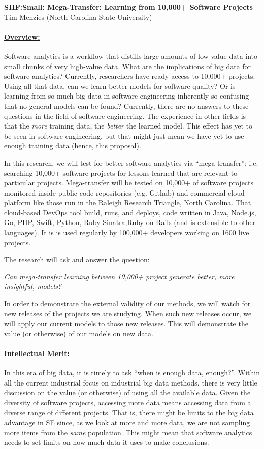 \documentclass[11pt,letterpaper]{article}
\newcommand\myTitle{\newpage
\begin{center}
{\bf SHF:Small: Mega-Transfer: Learning from 10,000+ Software Projects}\\
Tim Menzies (North Carolina State University)
\end{center}}
\newcommand\head[1]{\paragraph{\underline{#1}}}
\begin{document}
\pagestyle{plain}
\myTitle
\pagestyle{empty}

\head{Overview:}
Software analytics is a workflow that distills large amounts of low-value data into small chunks of very high-value data. 
What are the implications of big data for software analytics? Currently, researchers have ready access to 10,000+ projects. 
Using all that data, can we learn better models for software quality?  Or is learning from so much big data in software engineering inherently so confusing that no general models can be found?
Currently, there are no answers to these questions in the field of software engineering.  The experience in other fields is that the
{\em more} training data,  the {\em better} the learned model. This effect has yet to be seen in software engineering,
but that might just mean we have yet to use enough training data (hence, this proposal).

In this research, we will test for   better software analytics
via ``mega-transfer''; i.e. searching  10,000+ software projects for lessons learned that are relevant to particular projects.
Mega-transfer will  be tested on 10,000+  of software projects monitored inside public code repositories (e.g. Github) and commercial cloud platform 
like those run in  the Raleigh Research Triangle,  North Carolina.  
That cloud-based DevOps tool build, runs, and deploys, code written in Java, Node.js, Go, PHP, Swift, Python, Ruby Sinatra,Ruby on Rails (and is extensible to other languages). It is is used regularly by 100,000+ developers working on 1600 live projects.


The research  will ask and answer the question:
\begin{center}
{\em Can mega-transfer learning  between 10,000+ project generate better, more insightful, models?}
\end{center}
 
In order to demonstrate the external validity of our methods, we will watch for new releases of the projects we are studying. When such new releases occur, we will apply our current models to those new releases. This will demonstrate the value (or otherwise) of our models on new data.


\head{Intellectual Merit:} 
  In this era of big data, it is timely to ask ``when is enough data, enough?''.
Within all the current industrial focus on industrial big data methods, there is very
little discussion on the value (or otherwise) of using all the available data.
Given the diversity of software projects, accessing more data means accessing data from a diverse range of different projects. 
That is, there might be limits to the big data advantage in SE since,  as we look at more and more data, we are not sampling more items from the {\em same } population. This might mean that software analytics needs to set limits on how much data it uses to make conclusions.
\end{document}
